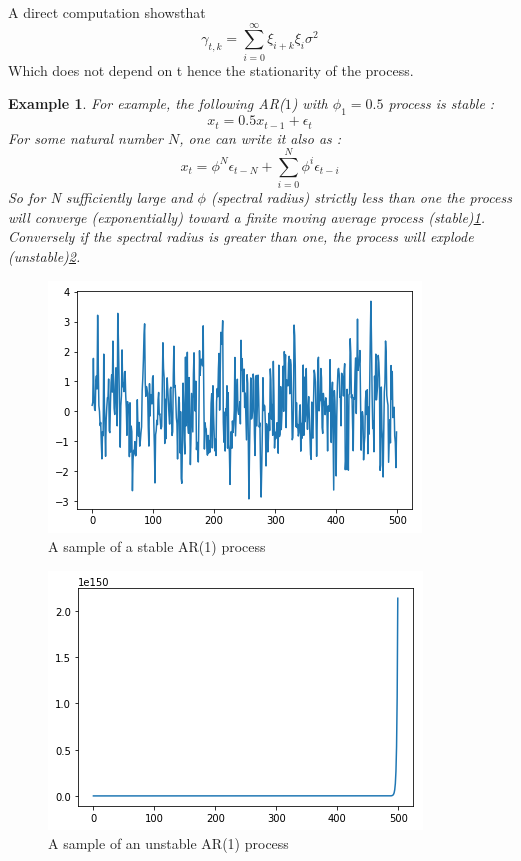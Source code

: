 \documentclass{article}
\newtheorem{ex}{Example}[section]
\begin{document}
A direct computation showsthat 
\begin{equation}\label{ACF_MA}
    \gamma_{t,k}=\sum_{i=0}^{\infty}\xi_{i+k}\xi_{i}\sigma^{2}
\end{equation}
Which does not depend on t hence the stationarity of the process. 
\begin{ex}
For example, the following AR($1$) with $\phi_1=0.5$ process is stable :  \begin{equation*}
    x_t=0.5x_{t-1}+\epsilon_t
\end{equation*}
For some natural number $N$, one can write it also as :
\begin{equation*}
    x_t=\phi^N\epsilon_{t-N}+\sum_{i=0}^N\phi^i\epsilon_{t-i}
\end{equation*}
So for N sufficiently large and $\phi$ (spectral radius) strictly less than one the process will converge (exponentially) toward a finite moving average process (stable)\ref{fig:AR(1)_stable_sample}. Conversely if the spectral radius is greater than one, the process will explode (unstable)\ref{fig:AR(1)_unstable_sample}.
\end{ex}
\begin{figure}
    \includegraphics[width=\textwidth]{AR(1)_stable.png}
    \caption{A sample of a stable AR(1) process}
    \label{fig:AR(1)_stable_sample}
\end{figure}
\begin{figure}
    \includegraphics[width=\textwidth]{AR(1)_unstable.png}
    \caption{A sample of an unstable AR(1) process}
    \label{fig:AR(1)_unstable_sample}
\end{figure}
\end{document}
